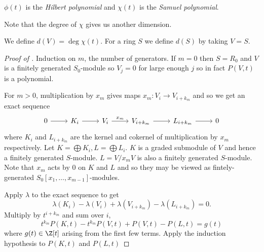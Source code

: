 \documentclass[a4paper]{article}
\begin{document}
\begin{definition}
  \(\phi(t)\) is the \emph{Hilbert polynomial} and \(\chi(t)\) is the \emph{Samuel polynomial}.
\end{definition}

Note that the degree of \(\chi\) gives us another dimension.

\begin{definition}
  We define \(d(V) = \deg \chi(t)\). For a ring \(S\) we define \(d(S)\) by taking \(V = S\).
\end{definition}

\begin{proof}[Proof of ]
  Induction on \(m\), the number of generators. If \(m = 0\) then \(S = R_0\) and \(V\) is a finitely generated \(S_0\)-module so \(V_j = 0\) for large enough \(j\) so in fact \(P(V, t)\) is a polynomial.

  For \(m > 0\), multiplication by \(x_m\) gives maps \(x_m: V_i \to V_{i + k_m}\) and so we get an exact sequence
  \[
    \begin{tikzcd}
      0 \ar[r] & K_i \ar[r] & V_i \ar[r, "x_m"] & V_{i + k_m} \ar[r] & L_{i + k_m} \ar[r] & 0
    \end{tikzcd}
  \]
  where \(K_i\) and \(L_{i + k_m}\) are the kernel and cokernel of multiplication by \(x_m\) respectively. Let \(K = \bigoplus K_i, L = \bigoplus L_i\). \(K\) is a graded submodule of \(V\) and hence a finitely generated \(S\)-module. \(L = V/x_m V\) is also a finitely generated \(S\)-module. Note that \(x_m\) acts by \(0\) on \(K\) and \(L\) and so they may be viewed as fintely-generated \(S_0[x_1, \dots, x_{m - 1}]\)-modules.

  Apply \(\lambda\) to the exact sequence to get
  \[
    \lambda(K_i) - \lambda(V_i) + \lambda(V_{i + k_m}) - \lambda(L_{i + k_m}) = 0.
  \]
  Multiply by \(t^{i + k_m}\) and sum over \(i\),
  \[
    t^{k_m} P(K, t) - t^{k_m} P(V, t) + P(V, t) - P(L, t) = g(t)
  \]
  where \(g(t) \in \Z[t]\) arising from the first few terms. Apply the induction hypothesis to \(P(K, t)\) and \(P(L, t)\)
\end{proof}
\end{document}
